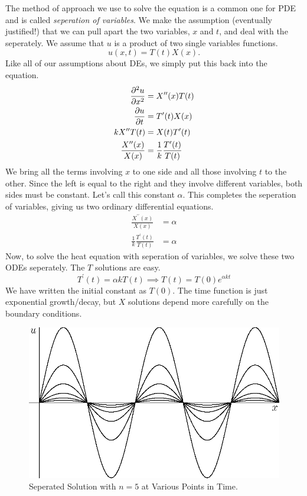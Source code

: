 \documentclass[fleqn,letterpaper]{report}
\begin{document}
The method of approach we use to solve the equation is a
common one for PDE and is called \emph{seperation of
variables}. We make the assumption (eventually justified!)
that we can pull apart the two variables, $x$ and $t$, and
deal with the seperately. We assume that $u$ is a product of
two single variables functions.
\begin{equation*}
u(x,t) = T(t) X(x).
\end{equation*}
Like all of our assumptions about DEs, we simply put this back
into the equation.
\begin{align*}
\frac{\partial^2 u}{\partial x^2} & = X^{\prime \prime}(x) T(t) \\
\frac{\partial u}{\partial t} & = T^{\prime}(t) X(x) \\
k X^{\prime \prime} T(t) & = X(t) T^\prime(t) \\
\frac{X^{\prime \prime}(x)}{X(x)} & = \frac{1}{k}
\frac{T^\prime(t)}{T(t)} 
\end{align*}
We bring all the terms involving $x$ to one side and
all those involving $t$ to the other. Since the left is equal
to the right and they involve different variables, both sides
must be constant. Let's call this constant $\alpha$. This
completes the seperation of variables, giving us two
ordinary differential equations.
\begin{align*}
\frac{X^{\prime \prime}(x)}{X(x)} & = \alpha \\
\frac{1}{k} \frac{T^\prime(t)}{T(t)} & = \alpha
\end{align*}
Now, to solve the heat equation with seperation of variables,
we solve these two ODEs seperately. The $T$ solutions are easy.
\begin{equation*}
T^\prime(t) = \alpha k T(t) \implies T(t) = T(0) e^{\alpha kt}
\end{equation*}
We have written the initial constant as $T(0)$. The time
function is just exponential growth/decay, but $X$ solutions
depend more carefully on the boundary conditions. 

\begin{figure}[t]
\centering
\includegraphics[width=12cm]{figure41.eps}
\caption{Seperated Solution with $n=5$ at Various Points in
Time.}
\label{figure-seperable-solution1}
\end{figure}
\end{document}
